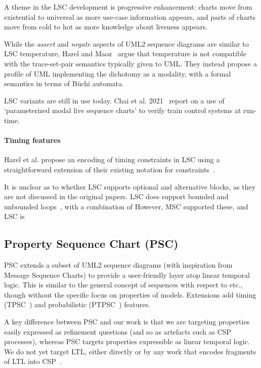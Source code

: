 A theme in the LSC development is progressive enhancement: charts move
from existential to universal as more use-case information appears,
and parts of charts move from cold to hot as more knowledge about
liveness appears.

While the \emph{assert} and \emph{negate} aspects of UML2 sequence diagrams
are similar to LSC temperature, Harel and Maoz~\cite{Harel08-ModalSD} argue
that temperature is not compatible with the trace-set-pair semantics typically
given to UML.  They instead propose a profile of UML implementing the
dichotomy as a modality, with a formal semantics in terms of B\"uchi automata.

LSC variants are still in use today. 
Chai et al. 2021~\cite{Chai21-PMLSC} report on a use of `parameterized modal
live sequence charts' to verify train control systems at run-time.

\paragraph{Timing features}
Harel et al. propose an encoding of timing constraints in LSC using a
straightforward extension of their existing notation for
constraints~\cite{Harel03-MSC}.

\begin{remark}
It is unclear as to whether LSC supports optional and
alternative blocks,
as they are not discussed in the original papers.
LSC does support bounded and unbounded loops~\cite{Harel03-MSC}, with a combination of
However, MSC supported these, and LSC is 
\end{remark}

\subsection{Property Sequence Chart (PSC)}

PSC extends a subset of UML2 sequence diagrams (with inspiration from
Message Sequence Charts) to provide a
user-friendly layer atop linear temporal logic.  This is
similar to the general concept of \langname{} sequences with respect to \tockcsp{}
etc., though without the
specific focus on properties of \robochart{} models.
Extensions add timing (TPSC~\cite{tpsc}) and
probabilistic (PTPSC~\cite{ptpsc}) features.

A key difference between PSC and our work is that we are
targeting  properties easily expressed as refinement questions
(and so as artefacts such as CSP processes), whereas PSC targets properties
expressible as linear temporal logic.  We do not yet target LTL,
either directly or by any work that encodes fragments of LTL into
CSP~\cite{fdrspin,Lowe08-CommunicatingProcessSpecification}.

